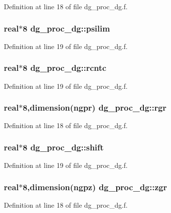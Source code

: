 Definition at line 18 of file dg\_\-proc\_\-dg.f.\hypertarget{namespacedg__proc__dg_5107aa7a882e962895ad0db819eac7f9}{
\subsubsection[psilim]{\setlength{\rightskip}{0pt plus 5cm}real$\ast$8 {\bf dg\_\-proc\_\-dg::psilim}}}
\label{namespacedg__proc__dg_5107aa7a882e962895ad0db819eac7f9}




Definition at line 19 of file dg\_\-proc\_\-dg.f.\hypertarget{namespacedg__proc__dg_a41e0e0e8c2ba411d2b43e2265775189}{
\subsubsection[rcntc]{\setlength{\rightskip}{0pt plus 5cm}real$\ast$8 {\bf dg\_\-proc\_\-dg::rcntc}}}
\label{namespacedg__proc__dg_a41e0e0e8c2ba411d2b43e2265775189}




Definition at line 19 of file dg\_\-proc\_\-dg.f.\hypertarget{namespacedg__proc__dg_37701a396c79a6a032240cbce2a97e69}{
\subsubsection[rgr]{\setlength{\rightskip}{0pt plus 5cm}real$\ast$8,dimension(ngpr) {\bf dg\_\-proc\_\-dg::rgr}}}
\label{namespacedg__proc__dg_37701a396c79a6a032240cbce2a97e69}




Definition at line 18 of file dg\_\-proc\_\-dg.f.\hypertarget{namespacedg__proc__dg_5b2c26eb45e5141de307ba77ec9b63f7}{
\subsubsection[shift]{\setlength{\rightskip}{0pt plus 5cm}real$\ast$8 {\bf dg\_\-proc\_\-dg::shift}}}
\label{namespacedg__proc__dg_5b2c26eb45e5141de307ba77ec9b63f7}




Definition at line 19 of file dg\_\-proc\_\-dg.f.\hypertarget{namespacedg__proc__dg_6664346fe46f234f41c923f7d8710b09}{
\subsubsection[zgr]{\setlength{\rightskip}{0pt plus 5cm}real$\ast$8,dimension(ngpz) {\bf dg\_\-proc\_\-dg::zgr}}}
\label{namespacedg__proc__dg_6664346fe46f234f41c923f7d8710b09}




Definition at line 18 of file dg\_\-proc\_\-dg.f.